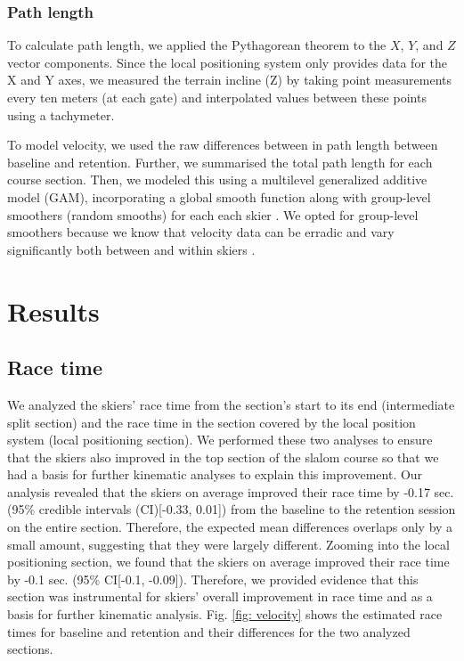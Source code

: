 \documentclass{article}
\begin{document}
\subsubsection{Path length}
To calculate path length, we applied the Pythagorean theorem to the $X$, $Y$, and $Z$ vector components. Since the local positioning system only provides data for the X and Y axes, we measured the terrain incline (Z) by taking point measurements every ten meters (at each gate) and interpolated values between these points using a tachymeter.

To model velocity, we used the raw differences between in path length between baseline and retention. Further, we summarised the total path length for each course section. Then, we modeled this using a multilevel generalized additive model (GAM), incorporating a global smooth function along with group-level smoothers (random smooths) for each each skier \cite{pedersen_hierarchical_2019}. We opted for group-level smoothers because we know that velocity data can be erradic and vary significantly both between and within skiers \cite{federolf_quantifying_2012, supej_impact_2015, reid_kinematic_2010}. 


\section{Results}

\subsection{Race time}
We analyzed the skiers' race time from the section's start to its end (intermediate split section) and the race time in the section covered by the local position system (local positioning section). We performed these two analyses to ensure that the skiers also improved in the top section of the slalom course so that we had a basis for further kinematic analyses to explain this improvement. Our analysis revealed that the skiers on average improved their race time by -0.17 sec. (95\% credible intervals (CI)[-0.33, 0.01]) from the baseline to the retention session on the entire section. Therefore, the expected mean differences overlaps only by a small amount, suggesting that they were largely different. Zooming into the local positioning section, we found that the skiers on average improved their  race time by -0.1 sec. (95\% CI[-0.1, -0.09]). Therefore, we provided evidence that this section was instrumental for skiers’ overall improvement in race time and as a basis for further kinematic analysis. Fig. \ref{fig: velocity} shows the estimated race times for baseline and retention and their differences for the two analyzed sections. 
\end{document}
